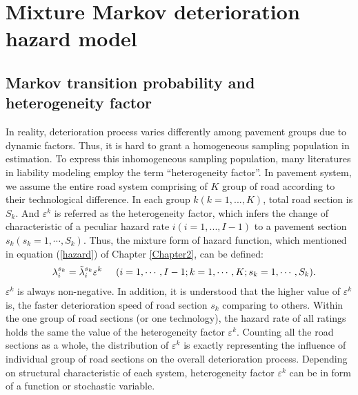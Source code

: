 \section{Mixture Markov deterioration hazard model}
\label{64}
\subsection{Markov transition probability and heterogeneity factor}
\label{641}
In reality, deterioration process varies differently among pavement groups due to dynamic factors. Thus, it is hard to grant a homogeneous sampling population in estimation. To express this inhomogeneous sampling population, many literatures in liability modeling employ the term ``heterogeneity factor''. In pavement system, we assume the entire road system comprising of $K$ group of road according to their technological difference. In each group $k (k=1,...,K)$, total road section is $S_k$. And $\varepsilon^k$ is referred as the heterogeneity factor, which infers the change of characteristic of a peculiar hazard rate $i(i=1,...,I-1)$ to a pavement section $s_k(s_k=1,\cdots,S_k)$. Thus, the mixture form of hazard function, which mentioned in equation (\ref{hazard}) of Chapter \ref{Chapter2}, can be defined:
\begin{eqnarray}
&& \lambda_i^{s_k} = \tilde{\lambda}_i^{s_k}\varepsilon^k \hspace{5mm}
 (i=1,\cdots,I-1;k=1,\cdots,K;s_k=1,\cdots,S_k).  \label{hu1}
\end{eqnarray}
$\varepsilon^k$ is always non-negative. In addition, it is understood that the higher value of $\varepsilon^k$ is, the faster deterioration speed of road section $s_k$ comparing to others. Within the one group of road sections (or one technology), the hazard rate of all ratings holds the same the value of the heterogeneity factor $\varepsilon^k$. Counting all the road sections as a whole, the distribution of $\varepsilon^k$ is exactly representing the influence of individual group of road sections on the overall deterioration process. Depending on structural characteristic of each system, heterogeneity factor $\varepsilon^k$ can be in form of a function or stochastic variable.

